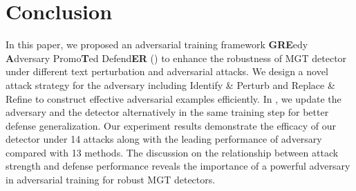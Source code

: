 \section{Conclusion}
\vspace{-0.2cm}
In this paper, we proposed an adversarial training framework \textbf{GRE}edy \textbf{A}dversary
Promo\textbf{T}ed Defend\textbf{ER} (\modelname) to enhance the robustness of MGT detector under different text perturbation and adversarial attacks.
We design a novel attack strategy for the adversary including Identify \& Perturb and Replace \& Refine to construct effective adversarial examples efficiently.
In \modelname, we update the adversary and the detector alternatively in the same training step for better defense generalization.
Our experiment results demonstrate the efficacy of our detector  under 14 attacks along with the leading performance of adversary \attackname compared with 13 methods.
The discussion on the relationship between attack strength and defense performance reveals the importance of a powerful adversary in adversarial training for robust MGT detectors.

